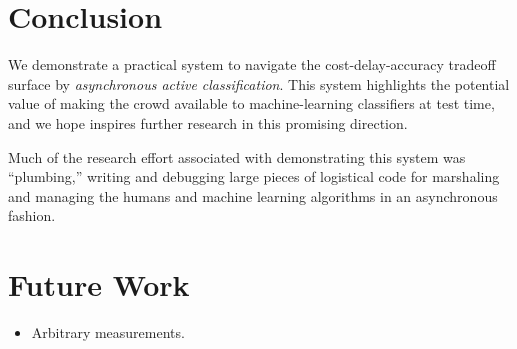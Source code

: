 \section{Conclusion}
\label{sec:conclusion}

We demonstrate a practical system to navigate the cost-delay-accuracy tradeoff surface by \textit{asynchronous active classification}.
 This system highlights the potential value of making the crowd available to machine-learning classifiers at test time, and we hope inspires further research in this promising direction.

Much of the research effort associated with demonstrating this system was ``plumbing,'' writing and debugging large pieces of logistical code for marshaling and managing the humans and machine learning algorithms in an asynchronous fashion.

\section{Future Work}

\begin{itemize}
  \item Arbitrary measurements.
\end{itemize}

